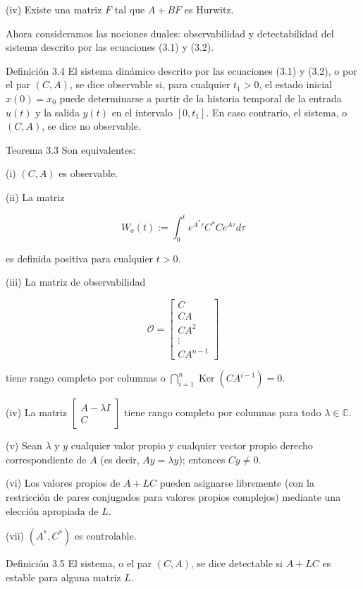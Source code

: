 \documentclass[11pt]{article}
\begin{document}
(iv) Existe una matriz $F$ tal que $A+B F$ es Hurwitz.

Ahora consideramos las nociones duales: observabilidad y detectabilidad del sistema descrito por las ecuaciones (3.1) y (3.2).

Definición 3.4 El sistema dinámico descrito por las ecuaciones (3.1) y (3.2), o por el par $(C, A)$, se dice observable si, para cualquier $t_{1}>0$, el estado inicial $x(0)=x_{0}$ puede determinarse a partir de la historia temporal de la entrada $u(t)$ y la salida $y(t)$ en el intervalo $\left[0, t_{1}\right]$. En caso contrario, el sistema, o $(C, A)$, se dice no observable.

Teorema 3.3 Son equivalentes:

(i) $(C, A)$ es observable.

(ii) La matriz

$$
W_{o}(t):=\int_{0}^{t} e^{A^{*} \tau} C^{*} C e^{A \tau} d \tau
$$

es definida positiva para cualquier $t>0$.

(iii) La matriz de observabilidad

$$
\mathcal{O}=\left[\begin{array}{c}
C \\
C A \\
C A^{2} \\
\vdots \\
C A^{n-1}
\end{array}\right]
$$

tiene rango completo por columnas o $\bigcap_{i=1}^{n} \operatorname{Ker}\left(C A^{i-1}\right)=0$.

(iv) La matriz $\left[\begin{array}{c}A-\lambda I \\ C\end{array}\right]$ tiene rango completo por columnas para todo $\lambda \in \mathbb{C}$.

(v) Sean $\lambda$ y $y$ cualquier valor propio y cualquier vector propio derecho correspondiente de $A$ (es decir, $A y=\lambda y$); entonces $C y \neq 0$.

(vi) Los valores propios de $A+L C$ pueden asignarse libremente (con la restricción de pares conjugados para valores propios complejos) mediante una elección apropiada de $L$.

(vii) $\left(A^{*}, C^{*}\right)$ es controlable.

Definición 3.5 El sistema, o el par $(C, A)$, se dice detectable si $A+L C$ es estable para alguna matriz $L$.
\end{document}
